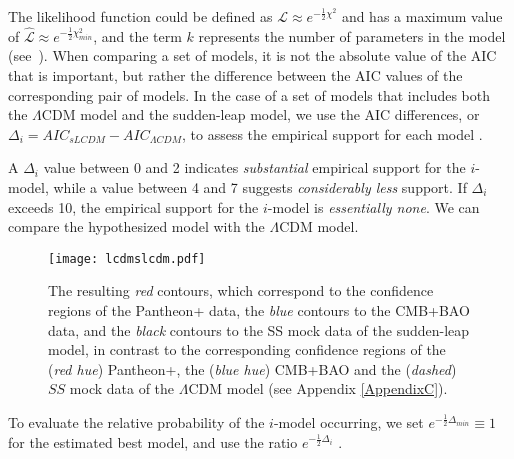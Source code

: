 \documentclass[universe,article,accept,moreauthors,pdftex]{Definitions/mdpi}
\begin{document}
The likelihood function could be defined as $\mathcal{L}\approx e^{-\frac{1}{2}\chi^{2}}$ and has a maximum value of $\hat{\mathcal{L}}\approx e^{-\frac{1}{2}\chi_{min}^{2}}$, and the term $k$ represents the number of  parameters in the model (\mbox{see \cite{burnham2003model})}. When comparing a set of models, it is not the absolute value of the AIC that is important, but rather the difference between the AIC values of the corresponding pair of models. In the case of a set of models that includes both the $\Lambda$CDM model and the sudden-leap model, we use the AIC differences, or $\Delta_{i}=AIC_{sLCDM}-AIC_{\Lambda CDM}$, to assess the empirical support for each model \cite{burnham2003model,Shi:2012ma}.

A $\Delta_{i}$ value between 0 and 2 indicates \textit{substantial} empirical support for the $i$-model, while a value between 4 and 7 suggests \textit{considerably less} support. If $\Delta_{i}$ exceeds 10, the empirical support for the $i$-model is \textit{essentially none}. We can compare the hypothesized model with the $\Lambda$CDM model.

\begin{figure}[h] 
    \texttt{[image: lcdmslcdm.pdf]}
    \caption{{The resulting} %
 \textit{red} contours, which correspond to the confidence regions of the Pantheon+ data, the \textit{blue} contours to the CMB+BAO data, and the \textit{black} contours to the SS mock data of the sudden-leap model, in contrast to the corresponding confidence regions of the (\textit{red hue}) Pantheon+, the (\textit{blue hue}) CMB+BAO and the (\textit{dashed}) $SS$ mock data of the $\Lambda$CDM model (see Appendix \ref{AppendixC}). }
    \label{Data01}
\end{figure}


To evaluate the relative probability of the $i$-model occurring, we set $e^{-\frac{1}{2}\Delta_{min}}\equiv 1$ for the estimated best model, and use the ratio $e^{-\frac{1}{2}\Delta_{i}}$ \cite{burnham2003model}. \\
\vspace{-9pt}







%
%
\end{document}
